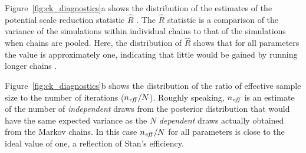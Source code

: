 Figure~{\ref{fig:ck_diagnostics}a} shows the distribution of the estimates of the potential scale reduction statistic $\hat{R}$  . The $\hat{R}$ statistic is a comparison of the variance of the simulations within individual chains to that of the simulations when chains are pooled. Here, the distribution of $\hat{R}$ shows that for all parameters the value is approximately one, indicating that little would be gained by running longer chains . 

Figure~{\ref{fig:ck_diagnostics}b} shows the distribution of the ratio of effective sample size to the number of iterations ($n_{\it eff}/N$). Roughly speaking, $n_{\it eff}$ is an estimate of the number of {\it independent} draws from the posterior distribution that would have the same expected variance as the $N$ {\it dependent} draws actually obtained from the Markov chains. In this case $n_{\it eff}/N$ for all parameters is close to the ideal value of one, a reflection of Stan's efficiency. 


